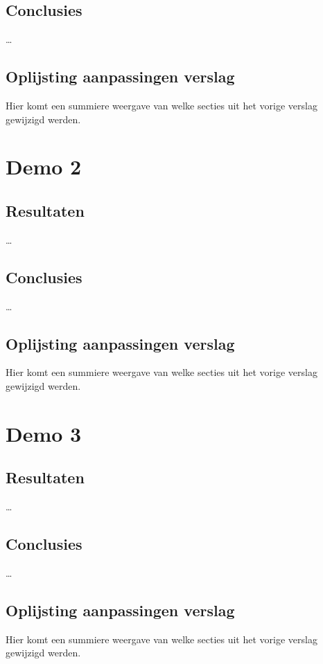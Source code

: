 \documentclass[tt2]{penoverslag}
\begin{document}
\subsection{Conclusies}
\ldots

\subsection{Oplijsting aanpassingen verslag}
Hier komt een summiere weergave van welke secties uit het vorige verslag gewijzigd werden.


\section{Demo 2}

\subsection{Resultaten}
\ldots

\subsection{Conclusies}
\ldots

\subsection{Oplijsting aanpassingen verslag}
Hier komt een summiere weergave van welke secties uit het vorige verslag gewijzigd werden.


\section{Demo 3}

\subsection{Resultaten}
\ldots

\subsection{Conclusies}
\ldots

\subsection{Oplijsting aanpassingen verslag}
Hier komt een summiere weergave van welke secties uit het vorige verslag gewijzigd werden.
\end{document}
